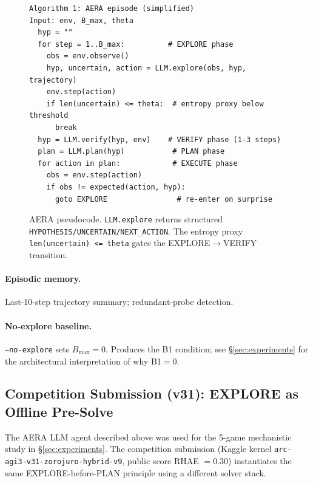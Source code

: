 \documentclass[11pt]{article}
\begin{document}
\begin{figure}[h]
\begin{small}
\begin{verbatim}
Algorithm 1: AERA episode (simplified)
Input: env, B_max, theta
  hyp = ""
  for step = 1..B_max:          # EXPLORE phase
    obs = env.observe()
    hyp, uncertain, action = LLM.explore(obs, hyp, trajectory)
    env.step(action)
    if len(uncertain) <= theta:  # entropy proxy below threshold
      break
  hyp = LLM.verify(hyp, env)    # VERIFY phase (1-3 steps)
  plan = LLM.plan(hyp)           # PLAN phase
  for action in plan:            # EXECUTE phase
    obs = env.step(action)
    if obs != expected(action, hyp):
      goto EXPLORE                # re-enter on surprise
\end{verbatim}
\end{small}
\caption{AERA pseudocode. \texttt{LLM.explore} returns structured \texttt{HYPOTHESIS/UNCERTAIN/NEXT\_ACTION}. The entropy proxy \texttt{len(uncertain) <= theta} gates the EXPLORE$\to$VERIFY transition.}
\end{figure}

\paragraph{Episodic memory.} Last-10-step trajectory summary; redundant-probe detection.

\paragraph{No-explore baseline.} \texttt{--no-explore} sets $B_{\max}{=}0$. Produces the B1 condition; see \S\ref{sec:experiments} for the architectural interpretation of why B1$=$0.

\subsection{Competition Submission (v31): EXPLORE as Offline Pre-Solve}
\label{sec:v31}

The AERA LLM agent described above was used for the 5-game mechanistic study in \S\ref{sec:experiments}. The competition submission (Kaggle kernel \texttt{arc-agi3-v31-zorojuro-hybrid-v9}, public score RHAE $= 0.30$) instantiates the same EXPLORE-before-PLAN principle using a different solver stack.
\end{document}
